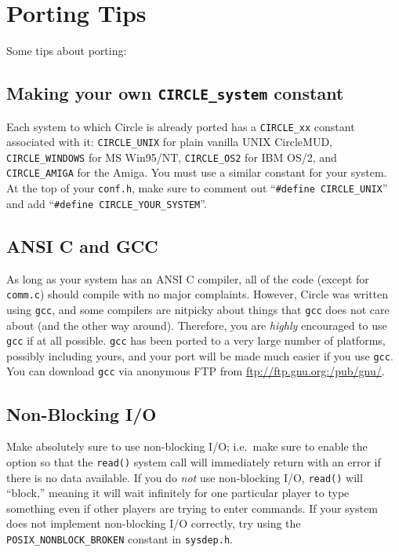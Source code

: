 \documentclass[11pt]{article}
\begin{document}
\section{Porting Tips}
Some tips about porting:

\subsection{Making your own \texttt{CIRCLE\_system} constant}
Each system to which Circle is already ported has a \texttt{CIRCLE\_xx} constant associated with it: \texttt{CIRCLE\_UNIX} for plain vanilla UNIX CircleMUD, \texttt{CIRCLE\_WINDOWS} for MS Win95/NT, \texttt{CIRCLE\_OS2} for IBM OS/2, and \texttt{CIRCLE\_AMIGA} for the Amiga.  You must use a similar constant for your system.  At the top of your \texttt{conf.h}, make sure to comment out ``\texttt{\#define CIRCLE\_UNIX}'' and add ``\texttt{\#define CIRCLE\_YOUR\_SYSTEM}''.

\subsection{ANSI C and GCC}
As long as your system has an ANSI C compiler, all of the code (except for \texttt{comm.c}) should compile with no major complaints. However, Circle was written using \texttt{gcc}, and some compilers are nitpicky about things that \texttt{gcc} does not care about (and the other way around).  Therefore, you are {\em highly} encouraged to use \texttt{gcc} if at all possible.  \texttt{gcc} has been ported to a very large number of platforms, possibly including yours, and your port will be made much easier if you use \texttt{gcc}.  You can download \texttt{gcc} via anonymous FTP from \url{ftp://ftp.gnu.org:/pub/gnu/}.

\subsection{Non-Blocking I/O}
Make absolutely sure to use non-blocking I/O; i.e.\ make sure to enable the option so that the \texttt{read()} system call will immediately return with an error if there is no data available. If you do {\em not} use non-blocking I/O, \texttt{read()} will ``block,'' meaning it will wait infinitely for one particular player to type something even if other players are trying to enter commands.  If your system does not implement non-blocking I/O correctly, try using the \texttt{POSIX\_NONBLOCK\_BROKEN} constant in \texttt{sysdep.h}.
\end{document}
